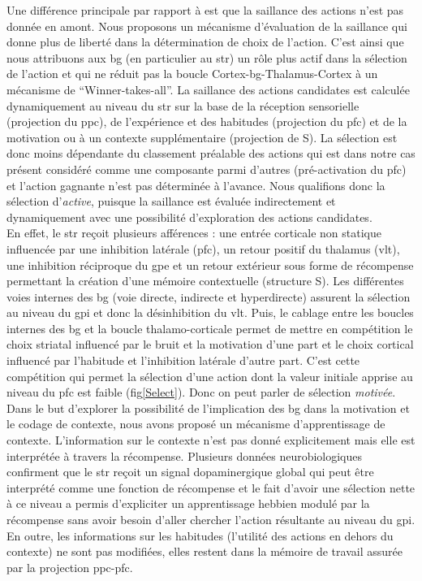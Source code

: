 Une différence principale par rapport à \cite{Gurney:2001a, Girard:2008} est que la saillance des actions n'est pas donnée en amont. Nous proposons un mécanisme d'évaluation de la saillance qui donne plus de liberté dans la détermination de choix de l'action. C'est ainsi que nous attribuons aux \gls{bg} (en particulier au \gls{str}) un rôle plus actif dans la sélection de l'action et qui ne réduit pas la boucle Cortex-\gls{bg}-Thalamus-Cortex à un mécanisme de ``Winner-takes-all''. La saillance des actions candidates est calculée dynamiquement au niveau du \gls{str} sur la base de la réception sensorielle (projection du \gls{ppc}), de l'expérience et des habitudes (projection du \gls{pfc}) et de la motivation ou à un contexte supplémentaire (projection de S). La sélection est donc moins dépendante du classement préalable des actions qui est dans notre cas présent considéré comme une composante parmi d'autres (pré-activation du \gls{pfc}) et l'action gagnante n'est pas déterminée à l'avance. Nous qualifions donc la sélection d'\textit{active}, puisque la saillance est évaluée indirectement et dynamiquement avec une possibilité d'exploration des actions candidates. \\

En effet, le \gls{str} reçoit plusieurs afférences : une entrée corticale non statique influencée par une inhibition latérale (\gls{pfc}), un retour positif du thalamus (\gls{vlt}), une inhibition réciproque du \gls{gpe} et un retour extérieur sous forme de récompense permettant la création d'une mémoire contextuelle (structure S). Les différentes voies internes des \gls{bg} (voie directe, indirecte et hyperdirecte) assurent la sélection au niveau du \gls{gpi} et donc la désinhibition du \gls{vlt}. Puis, le cablage entre les boucles internes des \gls{bg} et la boucle thalamo-corticale permet de mettre en compétition le choix striatal influencé par le bruit et la motivation d'une part et le choix cortical influencé par l'habitude et l'inhibition latérale d'autre part. C'est cette compétition qui permet la sélection d'une action dont la valeur initiale apprise au niveau du \gls{pfc} est faible (fig\ref{Select}). Donc on peut parler de sélection \textit{motivée}.\\

Dans le but d'explorer la possibilité de l'implication des \gls{bg} dans la motivation et le codage de contexte, nous avons proposé un mécanisme d'apprentissage de contexte. L'information sur le contexte n'est pas donné explicitement mais elle est interprétée à travers la récompense. Plusieurs données neurobiologiques confirment que le \gls{str} reçoit un signal dopaminergique global qui peut être interprété comme une fonction de récompense et le fait d'avoir une sélection nette à ce niveau a permis d'expliciter un apprentissage hebbien modulé par la récompense sans avoir besoin d'aller chercher l'action résultante au niveau du \gls{gpi}. En outre, les informations sur les habitudes (l'utilité des actions en dehors du contexte) ne sont pas modifiées, elles restent dans la mémoire de travail assurée par la projection \gls{ppc}-\gls{pfc}.\\

